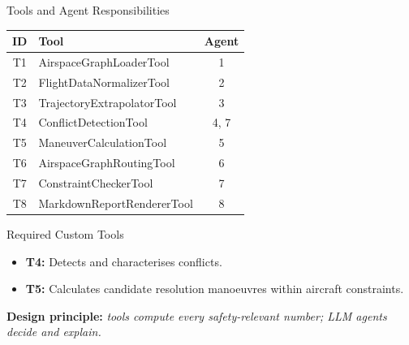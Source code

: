 

\begin{frame}{Tools and Agent Responsibilities}

\scriptsize

\begin{table}
\centering
\begin{tabular}{clc}
\toprule
\textbf{ID} & \textbf{Tool} & \textbf{Agent} \\
\midrule
T1 & AirspaceGraphLoaderTool & 1 \\
T2 & FlightDataNormalizerTool & 2 \\
T3 & TrajectoryExtrapolatorTool & 3 \\
T4 & ConflictDetectionTool & 4, 7 \\
T5 & ManeuverCalculationTool & 5 \\
T6 & AirspaceGraphRoutingTool & 6 \\
T7 & ConstraintCheckerTool & 7 \\
T8 & MarkdownReportRendererTool & 8 \\
\bottomrule
\end{tabular}
\end{table}

\vspace{0.25cm}

\begin{block}{Required Custom Tools}
\begin{itemize}
    \item \textbf{T4:} Detects and characterises conflicts.
    \item \textbf{T5:} Calculates candidate resolution
    manoeuvres within aircraft constraints.
\end{itemize}
\end{block}

\begin{center}
\small
\textbf{Design principle:}
\textit{tools compute every safety-relevant number; LLM agents decide and explain.}
\end{center}

\end{frame}
